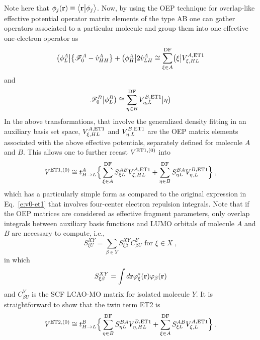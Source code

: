 %
Note here that $\phi_j({\bf r}) \equiv \bigl\langle {{\bf r}} \bigl\lvert {\phi_j} \bigr\rangle$.
Now, 
by using the OEP technique\cite{Blasiak.Bednarska.Choluj.Bartkowiak.XXXX}
for overlap\hyp{}like effective potential operator matrix elements of the type AB
one can gather operators associated to a particular molecule and group them
into one effective one\hyp{}electron operator
as
%
\begin{equation}
 \bigl( {\phi_L^A} \bigl\lvert \left\{ \mathscr{F}_0^A - \hat{v}^A_{HH} \right\}
 + \bigl( {\phi_H^A} \bigl\lvert 2 \hat{v}^A_{LH} 
 \cong \sum_{\xi\in A}^{\rm DF} \bigl( {\xi} \bigl\lvert V^{A,{\rm ET1}}_{\xi,HL}
\end{equation}
%
and
%
\begin{equation}
 \mathscr{F}_0^B \bigr\rvert {\phi_L^B} \bigr) \cong \sum_{\eta\in B}^{\rm DF} V^{B,{\rm ET1}}_{\eta,L} \bigr\rvert {\eta} \bigr) 
\end{equation}
%
In the above transformations, that involve the generalized density fitting
in an auxiliary basis set space,
$V^{A,{\rm ET1}}_{\xi,HL}$ and $V^{B,{\rm ET1}}_{\eta,L}$
are the OEP matrix elements associated with the above
effective potentials, separately defined for molecule $A$ and $B$. This allows one to
further recast $V^{{\rm ET1},(0)}$ into
%
\begin{multline}\label{e:v0-et1-oep}
 V^{{\rm ET1},(0)} \cong t_{H\rightarrow L}^A \Big\{ 
 \sum_{\xi\in A}^{\rm DF} S_{\xi L}^{AB} V^{A,{\rm ET1}}_{\xi,HL} +
 \sum_{\eta\in B}^{\rm DF} S_{\eta L}^{BA} V^{B,{\rm ET1}}_{\eta,L}
 \Big\} \;,
\end{multline}
%
which has a particularly simple form as compared to the original expression
in Eq.~\eqref{e:v0-et1} that involves four\hyp{}center electron repulsion integrals.
Note that if 
the OEP matrices are considered
as effective fragment parameters, %
only overlap integrals between auxiliary basis functions and LUMO orbitals of molecule
$A$ and $B$ are necessary to compute, i.e.,
%
\begin{equation}
 S^{XY}_{\xi U} = \sum_{\beta\in Y} S_{\xi\beta}^{XY} C_{\beta U}^Y \text{ for $\xi\in X$} \;,
\end{equation}
%
in which 
%
\begin{equation}
 S_{\xi\beta}^{XY} = \int d{\bf r} \varphi_\xi^*({\bf r}) \varphi_\beta({\bf r})
\end{equation}
%
and $C_{\beta U}^Y$ is the SCF LCAO-MO matrix for isolated molecule $Y$.
It is straightforward to show that the twin term ET2 is
%
\begin{multline}\label{e:v0-et2-oep}
 V^{{\rm ET2},(0)} \cong t_{H\rightarrow L}^B \Big\{ 
 \sum_{\eta\in B}^{\rm DF} S_{\eta L}^{BA} V^{B,{\rm ET1}}_{\eta,HL} +
 \sum_{\xi\in A}^{\rm DF} S_{\xi L}^{AB} V^{A,{\rm ET1}}_{\xi,L}
 \Big\} \;.
\end{multline}
%


